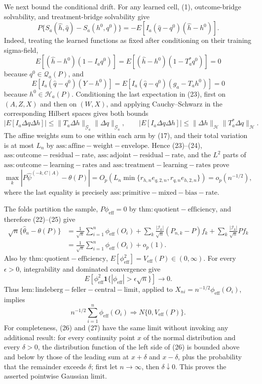 We next bound the conditional drift.  For any learned cell, (1), outcome-bridge solvability, and treatment-bridge solvability give
\[
 P\{S_a(\widehat h,\widehat q)-S_a(h^0,q^0)\}
 =-E[I_a(\widehat q-q^0)(\widehat h-h^0)].                                 \tag{23}
\]
Indeed, treating the learned functions as fixed after conditioning on their training sigma-field,
\[
 E[(\widehat h-h^0)(1-I_aq^0)]
 =E[(\widehat h-h^0)(1-T_a^*q^0)]=0
\]
because \(q^0\in\mathcal Q_a(P)\), and
\[
 E[I_a(\widehat q-q^0)(Y-h^0)]
 =E[I_a(\widehat q-q^0)(g_a-T_ah^0)]=0
\]
because \(h^0\in\mathcal H_a(P)\).  Conditioning the last expectation in (23), first on \((A,Z,X)\) and then on \((W,X)\), and applying Cauchy--Schwarz in the corresponding Hilbert spaces gives both bounds
\[
 |E[I_a\Delta q\Delta h]|
 \le\|T_a\Delta h\|_{\mathcal G_a}\|\Delta q\|_{\mathcal G_a},
 \qquad
 |E[I_a\Delta q\Delta h]|
 \le\|\Delta h\|_{\mathcal H}\|T_a^*\Delta q\|_{\mathcal H}.         \tag{24}
\]
The affine weights sum to one within each arm by (17), and their total variation is at most \(L_n\) by \(\mathrm{ass:affine-weight-envelope}\).  Hence (23)--(24), \(\mathrm{ass:outcome-residual-rate}\), \(\mathrm{ass:adjoint-residual-rate}\), and the \(L^2\) parts of \(\mathrm{ass:outcome-learning-rates}\) and \(\mathrm{ass:treatment-learning-rates}\) prove
\[
 \max_k|P\widehat\psi^{(-k,C\mid A)}-\theta(P)|
 =O_p\!\left(L_n\min\{r_{h,n}e_{q,2,n},r_{q,n}e_{h,2,n}\}\right)
 =o_p(n^{-1/2}),                                                             \tag{25}
\]
where the last equality is precisely \(\mathrm{ass:primitive-mixed-bias-rate}\).

The folds partition the sample, \(P\phi_{\mathrm{eff}}=0\) by \(\mathrm{thm:quotient-efficiency}\), and therefore (22)--(25) give
\[
\begin{aligned}
 \sqrt n\{\widehat\theta_n-\theta(P)\}
 &=\frac1{\sqrt n}\sum_{i=1}^n\phi_{\mathrm{eff}}(O_i)
 +\sum_k\frac{|\mathcal I_k|}{\sqrt n}(P_{n,k}-P)f_k
 +\sum_k\frac{|\mathcal I_k|}{\sqrt n}Pf_k\\
 &=\frac1{\sqrt n}\sum_{i=1}^n\phi_{\mathrm{eff}}(O_i)+o_p(1).          \tag{26}
\end{aligned}
\]
Also by \(\mathrm{thm:quotient-efficiency}\),
\(E[\phi_{\mathrm{eff}}^2]=V_{\mathrm{eff}}(P)\in(0,\infty)\).  For every \(\epsilon>0\), integrability and dominated convergence give
\[
 E[\phi_{\mathrm{eff}}^2\mathbf 1\{|\phi_{\mathrm{eff}}|>\epsilon\sqrt n\}]
 \longrightarrow0.
\]
Thus \(\mathrm{lem:lindeberg-feller-central-limit}\), applied to
\(X_{ni}=n^{-1/2}\phi_{\mathrm{eff}}(O_i)\), implies
\[
 n^{-1/2}\sum_{i=1}^n\phi_{\mathrm{eff}}(O_i)
 \Rightarrow N\{0,V_{\mathrm{eff}}(P)\}.                                  \tag{27}
\]
For completeness, (26) and (27) have the same limit without invoking any additional result: for every continuity point \(x\) of the normal distribution and every \(\delta>0\), the distribution function of the left side of (26) is bounded above and below by those of the leading sum at \(x+\delta\) and \(x-\delta\), plus the probability that the remainder exceeds \(\delta\); first let \(n\to\infty\), then \(\delta\downarrow0\).  This proves the asserted pointwise Gaussian limit.

